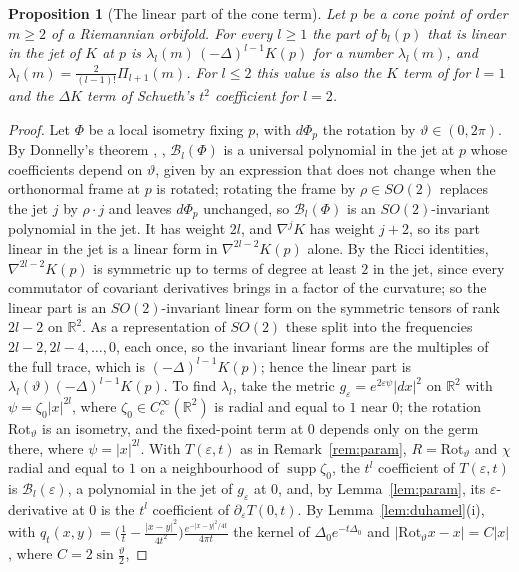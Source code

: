 \documentclass[pdflatex,sn-mathphys-num]{sn-jnl}
\theoremstyle{thmstyleone}%
\newtheorem{proposition}[theorem]{Proposition}%
\theoremstyle{thmstylethree}%
\newcommand{\R}{\mathbb{R}}
\begin{document}
\begin{proposition}[The linear part of the cone term]\label{prop:varcone}
Let $p$ be a cone point of order $m\ge2$ of a Riemannian orbifold. For every $l\ge1$ the part of $b_l(p)$ that is linear in the jet of $K$ at $p$ is $\lambda_l(m)\,(-\Delta)^{l-1}K(p)$ for a number $\lambda_l(m)$, and $\lambda_l(m)=\frac{2}{(l-1)!}\Pi_{l+1}(m)$. For $l\le2$ this value is also the $K$ term of \cite[(4.4)]{dggw2008} for $l=1$ and the $\Delta K$ term of Schueth's $t^2$ coefficient \cite[Thm~4.1]{schueth2019} for $l=2$.
\end{proposition}

\begin{proof}
Let $\Phi$ be a local isometry fixing $p$, with $d\Phi_p$ the rotation by $\vartheta\in(0,2\pi)$. By Donnelly's theorem \cite{donnelly1976}, \cite[4.1, 4.2, Thm~4.8]{dggw2008}, $\mathcal B_l(\Phi)$ is a universal polynomial in the jet at $p$ whose coefficients depend on $\vartheta$, given by an expression that does not change when the orthonormal frame at $p$ is rotated; rotating the frame by $\rho\in SO(2)$ replaces the jet $j$ by $\rho\cdot j$ and leaves $d\Phi_p$ unchanged, so $\mathcal B_l(\Phi)$ is an $SO(2)$-invariant polynomial in the jet. It has weight $2l$, and $\nabla^jK$ has weight $j+2$, so its part linear in the jet is a linear form in $\nabla^{2l-2}K(p)$ alone. By the Ricci identities, $\nabla^{2l-2}K(p)$ is symmetric up to terms of degree at least $2$ in the jet, since every commutator of covariant derivatives brings in a factor of the curvature; so the linear part is an $SO(2)$-invariant linear form on the symmetric tensors of rank $2l-2$ on $\R^2$. As a representation of $SO(2)$ these split into the frequencies $2l-2,2l-4,\dots,0$, each once, so the invariant linear forms are the multiples of the full trace, which is $(-\Delta)^{l-1}K(p)$; hence the linear part is $\lambda_l(\vartheta)(-\Delta)^{l-1}K(p)$. To find $\lambda_l$, take the metric $g_\varepsilon=e^{2\varepsilon\psi}|dx|^2$ on $\R^2$ with $\psi=\zeta_0|x|^{2l}$, where $\zeta_0\in C_c^\infty(\R^2)$ is radial and equal to $1$ near $0$; the rotation $\mathrm{Rot}_\vartheta$ is an isometry, and the fixed-point term at $0$ depends only on the germ there, where $\psi=|x|^{2l}$. With $T(\varepsilon,t)$ as in Remark~\ref{rem:param}, $R=\mathrm{Rot}_\vartheta$ and $\chi$ radial and equal to $1$ on a neighbourhood of $\operatorname{supp}\zeta_0$, the $t^l$ coefficient of $T(\varepsilon,t)$ is $\mathcal B_l(\varepsilon)$, a polynomial in the jet of $g_\varepsilon$ at $0$, and, by Lemma~\ref{lem:param}, its $\varepsilon$-derivative at $0$ is the $t^l$ coefficient of $\partial_\varepsilon T(0,t)$. By Lemma~\ref{lem:duhamel}(i), with $q_t(x,y)=\bigl(\frac1t-\frac{|x-y|^2}{4t^2}\bigr)\frac{e^{-|x-y|^2/4t}}{4\pi t}$ the kernel of $\Delta_0e^{-t\Delta_0}$ and $|\mathrm{Rot}_\vartheta x-x|=C|x|$, where $C=2\sin\frac\vartheta2$,

\end{proof}
\end{document}

